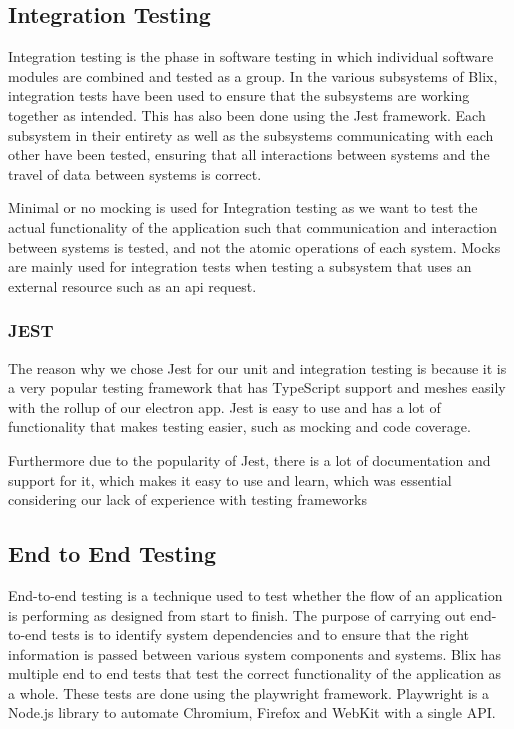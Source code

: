 \documentclass[11pt,a4paper]{article}
\begin{document}
\subsection*{Integration Testing}

Integration testing is the phase in software testing in which individual software modules are combined and tested as a group.
In the various subsystems of Blix, integration tests have been used to ensure that the subsystems are working together as intended. This has also been done using the Jest framework.
Each subsystem in their entirety as well as the subsystems communicating with each other have been tested, ensuring that all interactions between systems and the travel of data between systems is correct.

Minimal or no mocking is used for Integration testing as we want to test the actual functionality of the application such that communication and interaction between systems is tested, and
not the atomic operations of each system. Mocks are mainly used for integration tests when testing a subsystem that uses an external resource such as an api request. 


\subsubsection*{JEST}

The reason why we chose Jest for our unit and integration testing is because it is a very popular testing framework that has TypeScript support and meshes easily
with the rollup of our electron app. Jest is easy to use and has a lot of functionality that makes testing easier, such as mocking and code coverage.

Furthermore due to the popularity of Jest, there is a lot of documentation and support for it, which makes it easy to use and learn, which was essential considering our 
lack of experience with testing frameworks

\subsection*{End to End Testing}

End-to-end testing is a technique used to test whether the flow of an application is performing as designed from start to finish. The purpose of carrying out end-to-end tests is to identify system dependencies and to ensure that the right information is passed between various system components and systems.
Blix has multiple end to end tests that test the correct functionality of the application as a whole. These tests are done using the playwright framework. Playwright is a Node.js library to automate Chromium, Firefox and WebKit with a single API. 
\end{document}
